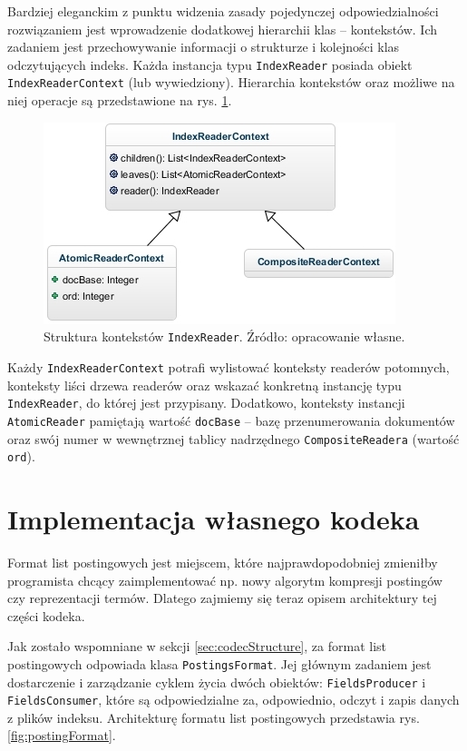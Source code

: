 Bardziej eleganckim z punktu widzenia zasady pojedynczej odpowiedzialności rozwiązaniem jest wprowadzenie dodatkowej hierarchii klas -- kontekstów. Ich zadaniem jest przechowywanie informacji o strukturze i kolejności klas odczytujących indeks. Każda instancja typu \texttt{IndexReader} posiada obiekt \texttt{IndexReaderContext} (lub wywiedziony). Hierarchia kontekstów oraz możliwe na niej operacje są przedstawione na rys. \ref{fig:indexReaderContexts}. 

\begin{figure}[here]
 \centering
 \includegraphics[scale=0.7]{pictures/ReaderContexts.jpg}
 \caption{Struktura kontekstów \texttt{IndexReader}. Źródło: opracowanie własne. \label{fig:indexReaderContexts}}
\end{figure}

Każdy \texttt{IndexReaderContext} potrafi wylistować konteksty readerów potomnych, konteksty liści drzewa readerów oraz wskazać konkretną instancję typu \texttt{IndexReader}, do której jest przypisany. Dodatkowo, konteksty instancji \texttt{AtomicReader} pamiętają wartość \texttt{docBase} -- bazę przenumerowania dokumentów oraz swój numer w wewnętrznej tablicy nadrzędnego \texttt{CompositeReadera} (wartość \texttt{ord}).

\section{Implementacja własnego kodeka}

Format list postingowych jest miejscem, które najprawdopodobniej zmieniłby programista chcący zaimplementować np. nowy algorytm kompresji postingów czy reprezentacji termów. Dlatego zajmiemy się teraz opisem architektury tej części kodeka. 

Jak zostało wspomniane w sekcji \ref{sec:codecStructure}, za format list postingowych odpowiada klasa \texttt{PostingsFormat}. Jej głównym zadaniem jest dostarczenie i zarządzanie cyklem życia dwóch obiektów: \texttt{FieldsProducer} i \texttt{FieldsConsumer}, które są odpowiedzialne za, odpowiednio, odczyt i zapis danych z plików indeksu. Architekturę formatu list postingowych przedstawia rys. \ref{fig:postingFormat}.

